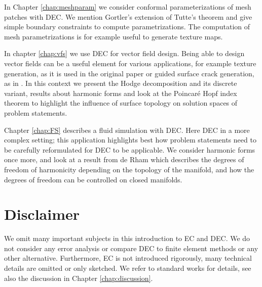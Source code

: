 In Chapter \ref{chap:meshparam} we consider conformal parameterizations of mesh patches with DEC. We mention Gortler's extension of Tutte's theorem and give simple boundary constraints to compute parametrizations. The computation of mesh parametrizations is for example useful to generate texture maps. 

In chapter \ref{chap:vfs} we use  DEC for vector field design. Being able to design vector fields can be a useful element for various applications, for example texture generation, as it is used in the original paper \cite{vField} or guided surface crack generation, as in \cite{kirtap}. In this context we present the Hodge decomposition and its discrete variant, results about harmonic forms and look at the Poincar\'e Hopf index theorem to highlight the influence of surface topology on solution spaces of problem statements.

Chapter \ref{chap:FS} describes a fluid simulation with DEC. Here DEC in a more complex setting; this application highlights best how problem statements need to be carefully reformulated for DEC to be applicable. We consider harmonic forms once more, and look at a result from de Rham which describes the degrees of freedom of harmonicity depending on the topology of the manifold, and how the degrees of freedom can be controlled on closed manifolds. 

\section{Disclaimer}
We omit many important subjects in this introduction to EC and DEC.  We do not consider any error analysis or compare DEC to finite element methods or any other alternative. Furthermore, EC is not introduced rigorously, many technical details are omitted or only sketched. We refer to standard works for details, see also the discussion in Chapter \ref{chap:discussion}.
	